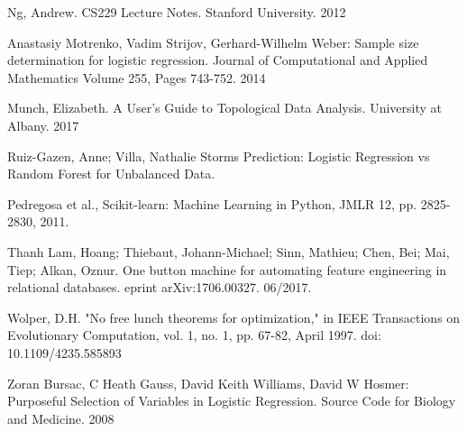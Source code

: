 \documentclass{llncs}
\begin{document}
\begin{thebibliography}{19}
Ng, Andrew. CS229 Lecture Notes. Stanford University. 2012

Anastasiy Motrenko, Vadim Strijov, Gerhard-Wilhelm Weber: Sample size determination for logistic regression. Journal of Computational and Applied Mathematics
Volume 255, Pages 743-752. 2014

Munch, Elizabeth. A User’s Guide to Topological Data Analysis. University at Albany. 2017

Ruiz-Gazen, Anne; Villa, Nathalie Storms Prediction: Logistic Regression vs Random Forest for Unbalanced Data.

Pedregosa et al., Scikit-learn: Machine Learning in Python, JMLR 12, pp. 2825-2830, 2011.

Thanh Lam, Hoang; Thiebaut, Johann-Michael; Sinn, Mathieu; Chen, Bei; Mai, Tiep; Alkan, Oznur.  One button machine for automating feature engineering in relational databases. eprint arXiv:1706.00327. 06/2017.

Wolper, D.H. "No free lunch theorems for optimization," in IEEE Transactions on Evolutionary Computation, vol. 1, no. 1, pp. 67-82, April 1997. doi: 10.1109/4235.585893

Zoran Bursac, C Heath Gauss, David Keith Williams, David W Hosmer: Purposeful Selection of Variables in Logistic Regression. Source Code for Biology and Medicine. 2008

\end{thebibliography}
\end{document}
